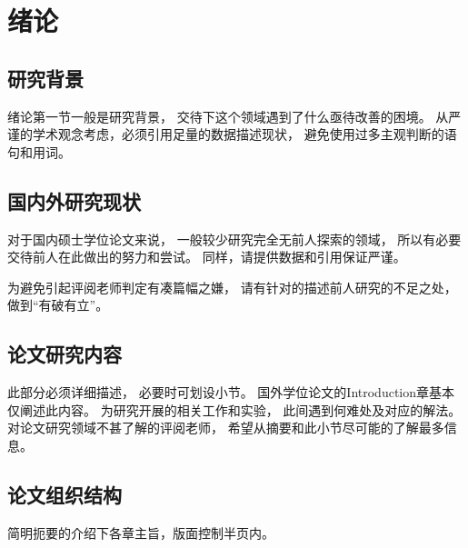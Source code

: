 

\chapter{绪论}

\section{研究背景}

绪论第一节一般是研究背景，
交待下这个领域遇到了什么亟待改善的困境。
从严谨的学术观念考虑，必须引用足量的数据描述现状，
避免使用过多主观判断的语句和用词。

\section{国内外研究现状}

对于国内硕士学位论文来说，
一般较少研究完全无前人探索的领域，
所以有必要交待前人在此做出的努力和尝试。
同样，请提供数据和引用保证严谨。

为避免引起评阅老师判定有凑篇幅之嫌，
请有针对的描述前人研究的不足之处，
做到``有破有立''。

\section{论文研究内容}

此部分必须详细描述，
必要时可划设小节。
国外学位论文的Introduction章基本仅阐述此内容。
为研究开展的相关工作和实验，
此间遇到何难处及对应的解法。
对论文研究领域不甚了解的评阅老师，
希望从摘要和此小节尽可能的了解最多信息。


\section{论文组织结构}

简明扼要的介绍下各章主旨，版面控制半页内。
